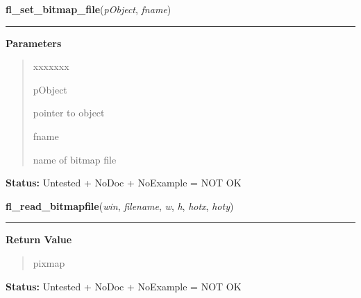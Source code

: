     \vspace{0.5ex}

\hspace{.8\funcindent}\begin{boxedminipage}{\funcwidth}

    \raggedright \textbf{fl\_set\_bitmap\_file}(\textit{pObject}, \textit{fname})

    \vspace{-1.5ex}

    \rule{\textwidth}{0.5\fboxrule}
\setlength{\parskip}{2ex}
\setlength{\parskip}{1ex}
      \textbf{Parameters}
      \vspace{-1ex}

      \begin{quote}
        \begin{Ventry}{xxxxxxx}

          \item[pObject]

          pointer to object

          \item[fname]

          name of bitmap file

        \end{Ventry}

      \end{quote}

\textbf{Status:} Untested + NoDoc + NoExample = NOT OK



    \end{boxedminipage}

    \label{xformslib:library:fl_read_bitmapfile}

    \vspace{0.5ex}

\hspace{.8\funcindent}\begin{boxedminipage}{\funcwidth}

    \raggedright \textbf{fl\_read\_bitmapfile}(\textit{win}, \textit{filename}, \textit{w}, \textit{h}, \textit{hotx}, \textit{hoty})

    \vspace{-1.5ex}

    \rule{\textwidth}{0.5\fboxrule}
\setlength{\parskip}{2ex}
\setlength{\parskip}{1ex}
      \textbf{Return Value}
    \vspace{-1ex}

      \begin{quote}
      pixmap

      \end{quote}

\textbf{Status:} Untested + NoDoc + NoExample = NOT OK



    \end{boxedminipage}

